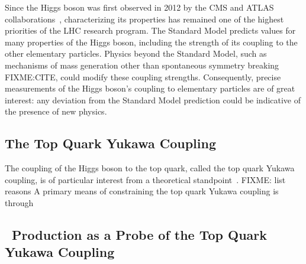 Since the Higgs boson was first observed in 2012 by the CMS and ATLAS collaborations~\cite{Aad:2012tfa, Chatrchyan:2012xdj, Chatrchyan:2013lba}, characterizing its properties has remained one of the highest priorities of the LHC research program. 
The Standard Model predicts values for many properties of the Higgs boson, including the strength of its coupling to the other elementary particles.
Physics beyond the Standard Model, such as mechanisms of mass generation other than spontaneous symmetry breaking FIXME:CITE, could modify these coupling strengths. 
Consequently, precise measurements of the Higgs boson's coupling to elementary particles are of great interest: any deviation from the Standard Model prediction could be indicative of the presence of new physics.
%
\subsection{The Top Quark Yukawa Coupling}
The coupling of the Higgs boson to the top quark, called the top quark Yukawa coupling, is of particular interest from a theoretical standpoint~\cite{why_care_top_yukawa}.
FIXME: list reasons
A primary means of constraining the top quark Yukawa coupling is through

\subsection{\ttH~Production as a Probe of the Top Quark Yukawa Coupling}
